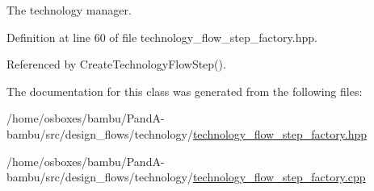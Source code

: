 The technology manager. 



Definition at line 60 of file technology\+\_\+flow\+\_\+step\+\_\+factory.\+hpp.



Referenced by Create\+Technology\+Flow\+Step().



The documentation for this class was generated from the following files\+:\begin{DoxyCompactItemize}
\item 
/home/osboxes/bambu/\+Pand\+A-\/bambu/src/design\+\_\+flows/technology/\hyperlink{technology__flow__step__factory_8hpp}{technology\+\_\+flow\+\_\+step\+\_\+factory.\+hpp}\item 
/home/osboxes/bambu/\+Pand\+A-\/bambu/src/design\+\_\+flows/technology/\hyperlink{technology__flow__step__factory_8cpp}{technology\+\_\+flow\+\_\+step\+\_\+factory.\+cpp}\end{DoxyCompactItemize}
